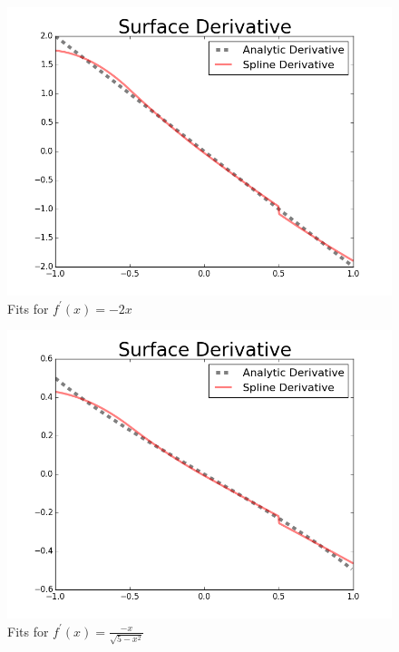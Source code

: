 \documentclass[12pt]{article}
\begin{document}
  \begin{figure}[h!]
    \centering
    \includegraphics[scale=0.75]{pderiv.png}
    \caption{Fits for $f^\prime(x)=-2x$}
  \end{figure}

  \begin{figure}[h!]
    \centering
    \includegraphics[scale=0.75]{arcderiv.png}
    \caption{Fits for $f^\prime(x)=\frac{-x}{\sqrt{5-x^2}}$}
  \end{figure}
  
\end{document}
